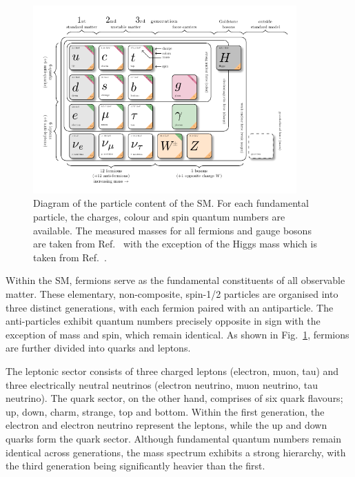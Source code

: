 \begin{figure}[h]
\centering
\includegraphics[width= 0.9\textwidth]{Figures/Introduction/Particles.pdf}
\caption{Diagram of the particle content of the SM. For each fundamental particle, the charges, colour and spin quantum numbers are available. The measured masses for all fermions and gauge bosons are taken from Ref.~\cite{ParticleMasses} with the exception of the Higgs mass which is taken from Ref.~\cite{Higgs_Mass}.}
\label{Figure:Introduction_1}
\end{figure}

Within the SM, fermions serve as the fundamental constituents of all observable matter. These elementary, non-composite, spin-1/2 particles are organised into three distinct generations, with each fermion paired with an antiparticle. The anti-particles exhibit quantum numbers precisely opposite in sign with the exception of mass and spin, which remain identical. As shown in Fig.~\ref{Figure:Introduction_1}, fermions are further divided into quarks and leptons. 

The leptonic sector consists of three charged leptons (electron, muon, tau) and three electrically neutral neutrinos (electron neutrino, muon neutrino, tau neutrino). The quark sector, on the other hand, comprises of six quark flavours; up, down, charm, strange, top and bottom. Within the first generation, the electron and electron neutrino represent the leptons, while the up and down quarks form the quark sector. Although fundamental quantum numbers remain identical across generations, the mass spectrum exhibits a strong hierarchy, with the third generation being significantly heavier than the first.

